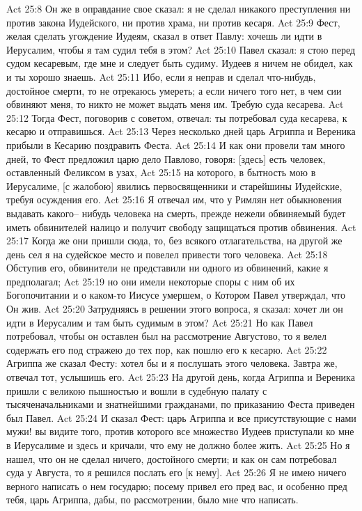 Act 25:8  Он же в оправдание свое сказал: я не сделал никакого преступления ни против закона Иудейского, ни против храма, ни против кесаря.
Act 25:9  Фест, желая сделать угождение Иудеям, сказал в ответ Павлу: хочешь ли идти в Иерусалим, чтобы я там судил тебя в этом?
Act 25:10  Павел сказал: я стою перед судом кесаревым, где мне и следует быть судиму. Иудеев я ничем не обидел, как и ты хорошо знаешь.
Act 25:11  Ибо, если я неправ и сделал что-нибудь, достойное смерти, то не отрекаюсь умереть; а если ничего того нет, в чем сии обвиняют меня, то никто не может выдать меня им. Требую суда кесарева.
Act 25:12  Тогда Фест, поговорив с советом, отвечал: ты потребовал суда кесарева, к кесарю и отправишься.
Act 25:13  Через несколько дней царь Агриппа и Вереника прибыли в Кесарию поздравить Феста.
Act 25:14  И как они провели там много дней, то Фест предложил царю дело Павлово, говоря: [здесь] есть человек, оставленный Феликсом в узах,
Act 25:15  на которого, в бытность мою в Иерусалиме, [с жалобою] явились первосвященники и старейшины Иудейские, требуя осуждения его.
Act 25:16  Я отвечал им, что у Римлян нет обыкновения выдавать какого-- нибудь человека на смерть, прежде нежели обвиняемый будет иметь обвинителей налицо и получит свободу защищаться против обвинения.
Act 25:17  Когда же они пришли сюда, то, без всякого отлагательства, на другой же день сел я на судейское место и повелел привести того человека.
Act 25:18  Обступив его, обвинители не представили ни одного из обвинений, какие я предполагал;
Act 25:19  но они имели некоторые споры с ним об их Богопочитании и о каком-то Иисусе умершем, о Котором Павел утверждал, что Он жив.
Act 25:20  Затрудняясь в решении этого вопроса, я сказал: хочет ли он идти в Иерусалим и там быть судимым в этом?
Act 25:21  Но как Павел потребовал, чтобы он оставлен был на рассмотрение Августово, то я велел содержать его под стражею до тех пор, как пошлю его к кесарю.
Act 25:22  Агриппа же сказал Фесту: хотел бы и я послушать этого человека. Завтра же, отвечал тот, услышишь его.
Act 25:23  На другой день, когда Агриппа и Вереника пришли с великою пышностью и вошли в судебную палату с тысяченачальниками и знатнейшими гражданами, по приказанию Феста приведен был Павел.
Act 25:24  И сказал Фест: царь Агриппа и все присутствующие с нами мужи! вы видите того, против которого все множество Иудеев приступали ко мне в Иерусалиме и здесь и кричали, что ему не должно более жить.
Act 25:25  Но я нашел, что он не сделал ничего, достойного смерти; и как он сам потребовал суда у Августа, то я решился послать его [к нему].
Act 25:26  Я не имею ничего верного написать о нем государю; посему привел его пред вас, и особенно пред тебя, царь Агриппа, дабы, по рассмотрении, было мне что написать.
